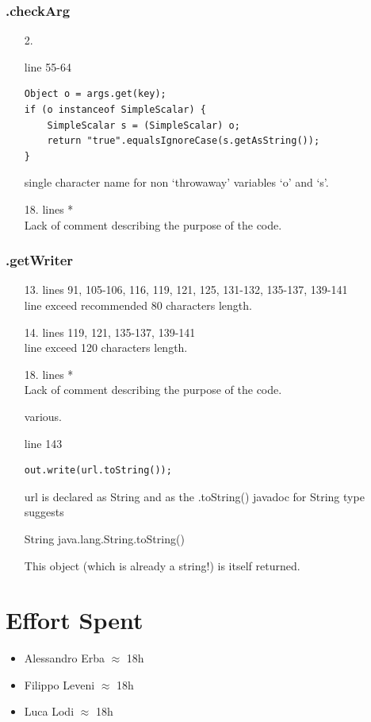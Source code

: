 \documentclass[english]{article}
\begin{document}
\subsubsection*{.checkArg}
\begin{itemize}

\item[2.]{line 55-64
		\begin{lstlisting} 
Object o = args.get(key);
if (o instanceof SimpleScalar) {
    SimpleScalar s = (SimpleScalar) o;
    return "true".equalsIgnoreCase(s.getAsString());
}
		\end{lstlisting}
		single character name for non `throwaway'  variables `o' and `s'.}
\item[18.]{lines  *\\
		Lack of comment describing the purpose of the code.}
\end{itemize}
\subsubsection*{.getWriter}
\begin{itemize}



\item[13.]{lines 91, 105-106, 116, 119, 121, 125, 131-132, 135-137, 139-141\\
		line exceed recommended 80 characters length.}

\item[14.]{lines  119, 121, 135-137, 139-141\\
		line exceed 120 characters length.}

\item[18.]{lines  *\\
		Lack of comment describing the purpose of the code.}

 \item[various.]{line 143
		\begin{lstlisting} 
out.write(url.toString());
		\end{lstlisting}
		url is declared as String and as the .toString() javadoc for String type suggests 
\begin{displayquote}
		String java.lang.String.toString()

This object (which is already a string!) is itself returned.
\end{displayquote}}
\end{itemize}





\clearpage
\section{Effort Spent} %
	\begin{itemize}
		\item Alessandro Erba $\approx$ 18h
		\item Filippo Leveni 	$\approx$ 18h
		\item Luca Lodi $\approx$ 18h
	\end{itemize}
\end{document}
